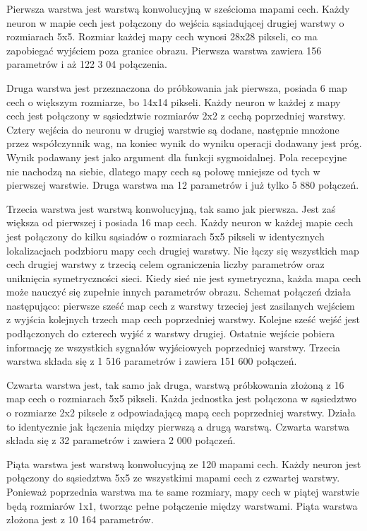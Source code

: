 \documentclass[12pt,a4paper,twoside,titlepage,openright]{book}
\begin{document}
\begin{itemize}
Pierwsza warstwa jest warstwą konwolucyjną w sześcioma mapami cech. Każdy neuron w mapie cech jest połączony do wejścia sąsiadującej drugiej warstwy o rozmiarach 5x5. Rozmiar każdej mapy cech wynosi 28x28 pikseli, co ma zapobiegać wyjściem poza granice obrazu. Pierwsza warstwa zawiera 156 parametrów i aż 122 3 04 połączenia.

Druga warstwa jest przeznaczona do próbkowania jak pierwsza, posiada 6 map cech o większym rozmiarze, bo 14x14 pikseli. Każdy neuron w każdej z mapy cech jest połączony w sąsiedztwie rozmiarów 2x2 z cechą poprzedniej warstwy. Cztery wejścia do neuronu w drugiej warstwie są dodane, następnie mnożone przez współczynnik wag, na koniec wynik do wyniku operacji dodawany jest próg. Wynik podawany jest jako argument dla funkcji sygmoidalnej. Pola recepcyjne nie nachodzą na siebie, dlatego mapy cech są połowę mniejsze od tych w pierwszej warstwie. Druga warstwa ma 12 parametrów i już tylko 5 880 połączeń.

Trzecia warstwa jest warstwą konwolucyjną, tak samo jak pierwsza. Jest zaś większa od pierwszej i posiada 16 map cech. Każdy neuron w każdej mapie cech jest połączony do kilku sąsiadów o rozmiarach 5x5 pikseli w identycznych lokalizacjach podzbioru mapy cech drugiej warstwy. Nie łączy się wszystkich map cech drugiej warstwy z trzecią celem ograniczenia liczby parametrów oraz uniknięcia symetryczności sieci. Kiedy sieć nie jest symetryczna, każda mapa cech może nauczyć się zupełnie innych parametrów obrazu. Schemat połączeń działa następująco: pierwsze sześć map cech z warstwy trzeciej jest zasilanych wejściem z wyjścia kolejnych trzech map cech poprzedniej warstwy. Kolejne sześć wejść jest podłączonych do czterech wyjść z warstwy drugiej. Ostatnie wejście pobiera informację ze wszystkich sygnałów wyjściowych poprzedniej warstwy. Trzecia warstwa składa się z 1 516 parametrów i zawiera 151 600 połączeń.

Czwarta warstwa jest, tak samo jak druga, warstwą próbkowania złożoną z 16 map cech o rozmiarach 5x5 pikseli. Każda jednostka jest połączona w sąsiedztwo o rozmiarze 2x2 piksele z odpowiadającą mapą cech poprzedniej warstwy. Działa to identycznie jak łączenia między pierwszą a drugą warstwą. Czwarta warstwa składa się z 32 parametrów i zawiera 2 000 połączeń.

Piąta warstwa jest warstwą konwolucyjną ze 120 mapami cech. Każdy neuron jest połączony do sąsiedztwa 5x5 ze wszystkimi mapami cech z czwartej warstwy. Ponieważ poprzednia warstwa ma te same rozmiary, mapy cech w piątej warstwie będą rozmiarów 1x1, tworząc pełne połączenie między warstwami. Piąta warstwa złożona jest z 10 164 parametrów.


\end{itemize}
\end{document}
